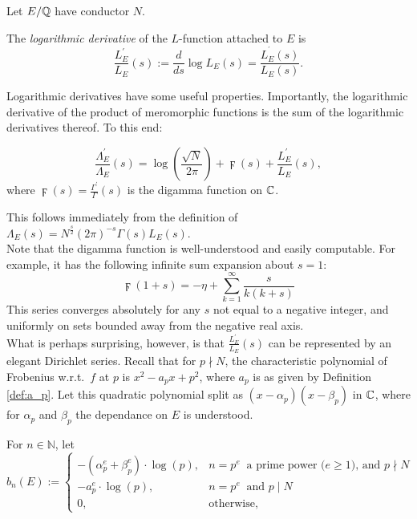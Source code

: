 \documentclass[10pt]{article}
\newcommand{\NN}{\mathbb{N}}
\newcommand{\pr}{^{\prime}}
\newcommand{\Les}{L_E(s)}
\newcommand{\Lams}{\Lambda_E(s)}
\newcommand{\ldLes}{\frac{L_E\pr}{L_E}(s)}
\newcommand{\ldLe}[1]{\frac{L_E\pr}{L_E}\left(#1\right)}
\newcommand{\ldLam}[1]{\frac{\Lambda_E\pr}{\Lambda_E}\left(#1\right)}
\begin{document}
Let $E/\mathbb{Q}$  have conductor $N$.
\begin{definition}
The {\it logarithmic derivative} of the $L$-function attached to $E$ is
\begin{equation}
\ldLes := \frac{d}{ds} \log \Les = \frac{L_E^{\pr}(s)}{\Les}.
\end{equation}
\end{definition}
Logarithmic derivatives have some useful properties. Importantly, the logarithmic derivative of the product of meromorphic functions is the sum of the logarithmic derivatives thereof. To this end:
\begin{proposition}
\begin{equation}\label{eqn:logderiv_relation}
\ldLam{s} = \log\left(\frac{\sqrt{N}}{2\pi}\right) + \digamma(s) + \ldLe{s},
\end{equation}
where $\digamma(s) = \frac{\Gamma\pr}{\Gamma}(s)$ is the digamma function on $\mathbb{C}$.
\end{proposition}
This follows immediately from the definition of $\Lams = N^{\frac{s}{2}}(2\pi)^{-s}\Gamma(s)\Les$. \\

Note that the digamma function is well-understood and easily computable. For example, it has the following infinite sum expansion about $s=1$:
\begin{equation}\label{eqn:digamma_sum}
\digamma(1+s) = -\eta + \sum_{k=1}^{\infty} \frac{s}{k(k+s)}
\end{equation}
This series converges absolutely for any $s$ not equal to a negative integer, and uniformly on sets bounded away from the negative real axis.\\

What is perhaps surprising, however, is that $\ldLe{s}$ can be represented by an elegant Dirichlet series. Recall that for $p \nmid N$, the characteristic polynomial of Frobenius w.r.t.~$f$ at $p$ is $x^2 - a_p x + p^2$, where $a_p$ is as given by Definition \ref{def:a_p}. Let this quadratic polynomial split as $(x-\alpha_p)(x-\beta_p)$ in $\mathbb{C}$, where for $\alpha_p$ and $\beta_p$ the dependance on $E$ is understood. \\

\begin{definition}\label{def:bn}
For $n \in \NN$, let
\begin{equation}
b_n(E) := \begin{cases}
-\left(\alpha_p^e+\beta_p^e\right)\cdot \log(p), & n=p^e\;\;\text{a prime power ($e\ge1$), and $p \nmid N$} \\
-a_p^e \cdot \log(p), & n=p^e\;\;\text{and $p \mid N$} \\
0, & \text{otherwise,} \end{cases}
\end{equation}
\end{definition}
\end{document}
